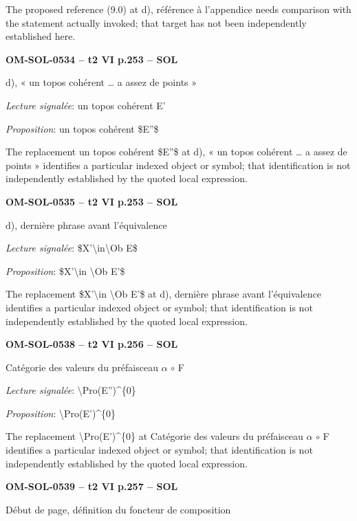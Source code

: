 The proposed reference (9.0) at d), référence à l'appendice needs comparison with the statement actually invoked; that target has not been independently established here.\par
\par\noindent\textbf{OM-SOL-0534 -- t2 VI p.253 -- SOL}\par
d), « un topos cohérent … a assez de points »\par
\emph{Lecture signalée}: un topos cohérent E'\par
\emph{Proposition}: un topos cohérent \$E''\$\par
The replacement un topos cohérent \$E''\$ at d), « un topos cohérent … a assez de points » identifies a particular indexed object or symbol; that identification is not independently established by the quoted local expression.\par
\par\noindent\textbf{OM-SOL-0535 -- t2 VI p.253 -- SOL}\par
d), dernière phrase avant l'équivalence\par
\emph{Lecture signalée}: \$X'\textbackslash{}in\textbackslash{}Ob E\$\par
\emph{Proposition}: \$X'\textbackslash{}in \textbackslash{}Ob E'\$\par
The replacement \$X'\textbackslash{}in \textbackslash{}Ob E'\$ at d), dernière phrase avant l'équivalence identifies a particular indexed object or symbol; that identification is not independently established by the quoted local expression.\par
\par\noindent\textbf{OM-SOL-0538 -- t2 VI p.256 -- SOL}\par
Catégorie des valeurs du préfaisceau \ensuremath{\alpha} \ensuremath{\circ} F\par
\emph{Lecture signalée}: \textbackslash{}Pro(E'')\textasciicircum{}\{0\}\par
\emph{Proposition}: \textbackslash{}Pro(E')\textasciicircum{}\{0\}\par
The replacement \textbackslash{}Pro(E')\textasciicircum{}\{0\} at Catégorie des valeurs du préfaisceau \ensuremath{\alpha} \ensuremath{\circ} F identifies a particular indexed object or symbol; that identification is not independently established by the quoted local expression.\par
\par\noindent\textbf{OM-SOL-0539 -- t2 VI p.257 -- SOL}\par
Début de page, définition du foncteur de composition\par
